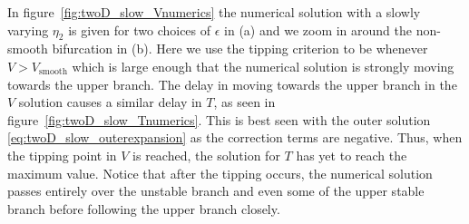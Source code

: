 \indent In figure~\ref{fig:twoD_slow_Vnumerics} the numerical solution with a slowly varying $\eta_2$ is given for two choices of $\epsilon$ in (a) and we zoom in around the non-smooth bifurcation in (b). Here we use the tipping criterion to be whenever $V>V_{\text{smooth}}$ which is large enough that the numerical solution is strongly moving towards the upper branch. The delay in moving towards the upper branch in the $V$ solution causes a similar delay in $T$, as seen in figure~\ref{fig:twoD_slow_Tnumerics}. This is best seen with the outer solution \eqref{eq:twoD_slow_outerexpansion} as the correction terms are negative. Thus, when the tipping point in $V$ is reached, the solution for $T$ has yet to reach the maximum value. Notice that after the tipping occurs, the numerical solution passes entirely over the unstable branch and even some of the upper stable branch before following the upper branch closely.

